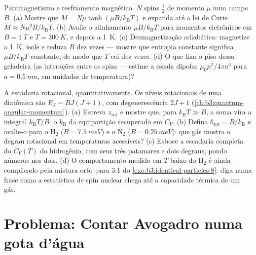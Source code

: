 \begin{exercise}[$\star\star\star$]\label{exo:b3:canonical-ensemble:11}
Paramagnetismo e resfriamento magnético. $N$ spins $\tfrac12$ de
momento $\mu$ num campo $B$. (a) Mostre que
$M = N\mu\tanh(\mu B/k_{\text{B}}T)$ e expanda até a lei de Curie
$M \approx N\mu^2B/k_{\text{B}}T$. (b) Avalie o alinhamento
$\mu B/k_{\text{B}}T$ para momentos eletrônicos em $B = \qty{1}{T}$ e
$T = \qty{300}{K}$, e depois a \qty{1}{K}. (c) Desmagnetização
adiabática: magnetize a \qty{1}{K}, isole e reduza $B$ dez vezes ---
mostre que entropia constante significa $\mu B/k_{\text{B}}T$
constante, de modo que $T$ cai dez vezes. (d) O que fixa o piso dessa
geladeira (as interações entre os spins --- estime a escala dipolar
$\mu_0\mu^2/4\pi a^3$ para $a =
\qty{0.5}{nm}$, em unidades de temperatura)?
\end{exercise}

\begin{exercise}[$\star\star\star$]\label{exo:b3:canonical-ensemble:12}
A escadaria rotacional, quantitativamente. Os níveis rotacionais de uma
diatômica são $E_J = BJ(J+1)$, com degenerescência $2J + 1$
(\cref{ch:b3:quantum-angular-momentum}). (a) Escreva
$z_{\text{rot}}$ e mostre que, para $k_{\text{B}}T \gg B$, a soma vira
a integral $k_{\text{B}}T/B$: o $k_{\text{B}}$ da equipartição
recuperado em $C_V$. (b) Defina $\theta_{\text{rot}} =
B/k_{\text{B}}$ e avalie-o para o H$_2$ ($B = \qty{7.5}{meV}$) e o
N$_2$ ($B = \qty{0.25}{meV}$): que gás mostra o degrau rotacional em
temperaturas acessíveis? (c) Esboce a escadaria completa do $C_V(T)$ do
hidrogênio, com seus três patamares e dois degraus, pondo números nos
dois. (d) O comportamento medido em $T$ baixo do H$_2$ é ainda
complicado pela mistura orto--para 3:1 do
\cref{exo:b3:identical-particles:8}: diga numa frase como a estatística
de spin nuclear chega até a capacidade térmica de um gás.
\end{exercise}

\section{Problema: Contar Avogadro numa gota d'água}

